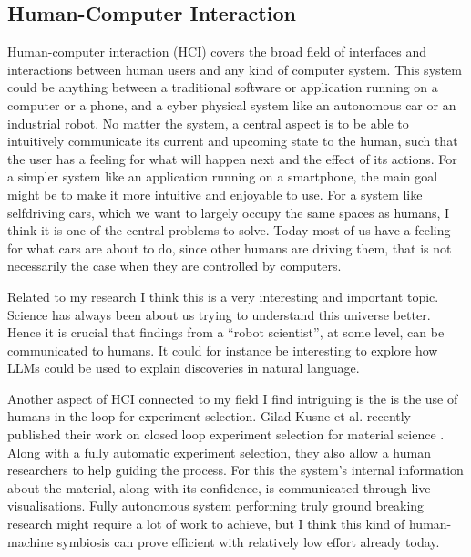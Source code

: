 \documentclass[11pt]{article}
\begin{document}
\subsection*{Human-Computer Interaction}
Human-computer interaction (HCI) covers the broad field of interfaces and interactions between human users and any kind of computer system. This system could be anything between a traditional software or application running on a computer or a phone, and a cyber physical system like an autonomous car or an industrial robot. No matter the system, a central aspect is to be able to intuitively communicate its current and upcoming state to the human, such that the user has a feeling for what will happen next and the effect of its actions. For a simpler system like an application running on a smartphone, the main goal might be to make it more intuitive and enjoyable to use. For a system like selfdriving cars, which we want to largely occupy the same spaces as humans, I think it is one of the central problems to solve. Today most of us have a feeling for what cars are about to do, since other humans are driving them, that is not necessarily the case when they are controlled by computers.

Related to my research I think this is a very interesting and important topic. Science has always been about us trying to understand this universe better. Hence it is crucial that findings from a ``robot scientist'', at some level, can be communicated to humans. It could for instance be interesting to explore how LLMs could be used to explain discoveries in natural language.



Another aspect of HCI connected to my field I find intriguing is the is the use of humans in the loop for experiment selection. Gilad Kusne et al. recently published their work on closed loop experiment selection for material science \cite{kusne_--fly_2020}. Along with a fully automatic experiment selection, they also allow a human researchers to help guiding the process. For this the system's internal information about the material, along with its confidence, is communicated through live visualisations. Fully autonomous system performing truly ground breaking research might require a lot of work to achieve, but I think this kind of human-machine symbiosis can prove efficient with relatively low effort already today.
\end{document}

